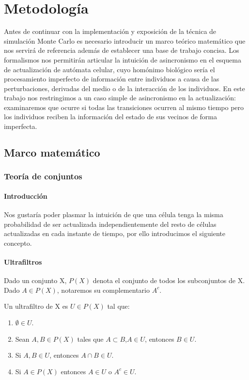 \documentclass[../proyecto.tex]{memoir}
\begin{document}
\chapter{Metodología}

Antes de continuar con la implementación y exposición de la técnica de simulación Monte Carlo es necesario introducir un marco teórico matemático que nos servirá de referencia además de establecer una base de trabajo concisa. Los formalismos nos permitirán articular la intuición de asincronismo en el esquema de actualización de autómata celular, cuyo homónimo biológico sería el procesamiento imperfecto de información entre individuos a causa de las perturbaciones, derivadas del medio o de la interacción de los individuos. En este trabajo nos restringimos a un caso simple de asincronismo en la actualización: examinaremos que ocurre si todas las transiciones ocurren al mismo tiempo pero los individuos reciben la información del estado de sus vecinos de forma imperfecta.

\section{Marco matemático}

\subsection{Teoría de conjuntos}

\subsubsection{Introducción}

Nos gustaría poder plasmar la intuición de que una célula tenga la misma probabilidad de ser actualizada independientemente del resto de células actualizadas en cada instante de tiempo, por ello introducimos el siguiente concepto. 

\subsubsection{Ultrafiltros}
Dado un conjunto X, $P(X)$ denota el conjunto de todos los subconjuntos de X. Dado $A \in P(X)$, notaremos su complementario $A^{c}$. 

Un ultrafiltro de X es $U \in P(X)$ tal que:

\begin{enumerate}
\item $\emptyset \in U$.
\item Sean $A,B \in P(X)$ tales que $A \subset B$,$ A \in U$, entonces $B \in U$.
\item Si $A,B \in U$, entonces $A \cap B \in U$.
\item Si $A \in P(X)$ entonces $A \in U$ o $ A^{c} \in U$.
\end{enumerate}
\end{document}
